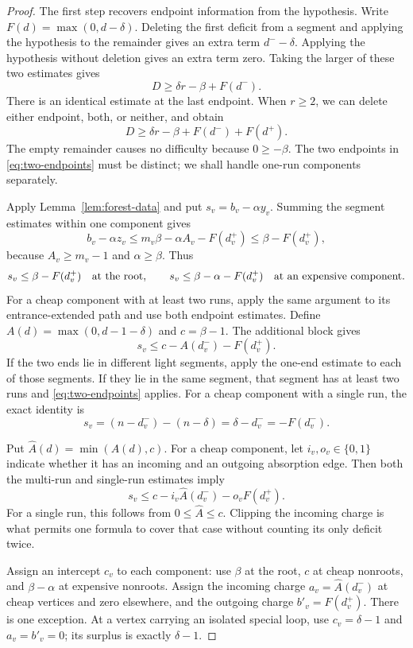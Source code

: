 \begin{proof}
The first step recovers endpoint information from the hypothesis.
Write $F(d)=\max(0,d-\delta)$. Deleting the first deficit from a
segment and applying the hypothesis to the remainder gives an extra
term $d^- -\delta$. Applying the hypothesis without deletion gives
an extra term zero. Taking the larger of these two estimates gives
\[
 D\ge\delta r-\beta+F(d^-).
\]
There is an identical estimate at the last endpoint. When $r\ge2$,
we can delete either endpoint, both, or neither, and obtain
\begin{equation}\label{eq:two-endpoints}
 D\ge\delta r-\beta+F(d^-)+F(d^+).
\end{equation}
The empty remainder causes no difficulty because $0\ge-\beta$.
The two endpoints in \eqref{eq:two-endpoints} must be distinct;
we shall handle one-run components separately.

Apply Lemma~\ref{lem:forest-data} and put
$s_v=b_v-\alpha y_v$. Summing the segment estimates within one
component gives
\[
 b_v-\alpha z_v
 \le m_v\beta-\alpha A_v-F(d_v^+)
 \le\beta-F(d_v^+),
\]
because $A_v\ge m_v-1$ and $\alpha\ge\beta$. Thus
\[
 s_v\le\beta-F(d_v^+)\quad\hbox{at the root},\qquad
 s_v\le\beta-\alpha-F(d_v^+)\quad\hbox{at an expensive component}.
\]
For a cheap component with at least two runs, apply the same argument
to its entrance-extended path and use both endpoint estimates. Define
$A(d)=\max(0,d-1-\delta)$ and $c=\beta-1$. The additional block gives
\[
 s_v\le c-A(d_v^-)-F(d_v^+).
\]
If the two ends lie in different light segments, apply the one-end
estimate to each of those segments. If they lie in the same segment,
that segment has at least two runs and \eqref{eq:two-endpoints} applies.
For a cheap component with a single run, the exact identity is
\[
 s_v=(n-d_v^-)-(n-\delta)=\delta-d_v^-=-F(d_v^-).
\]

Put $\widehat A(d)=\min(A(d),c)$. For a cheap component, let
$i_v,o_v\in\{0,1\}$ indicate whether it has an incoming and an
outgoing absorption edge. Then both the multi-run and single-run
estimates imply
\[
 s_v\le c-i_v\widehat A(d_v^-)-o_vF(d_v^+).
\]
For a single run, this follows from $0\le\widehat A\le c$.
Clipping the incoming charge is what permits one formula to cover that
case without counting its only deficit twice.

Assign an intercept $c_v$ to each component: use $\beta$ at the root,
$c$ at cheap nonroots, and $\beta-\alpha$ at expensive nonroots.
Assign the incoming charge $a_v=\widehat A(d_v^-)$ at cheap vertices
and zero elsewhere, and the outgoing charge $b'_v=F(d_v^+)$.
There is one exception. At a vertex carrying an isolated special loop,
use $c_v=\delta-1$ and $a_v=b'_v=0$; its surplus is exactly
$\delta-1$.


\end{proof}
